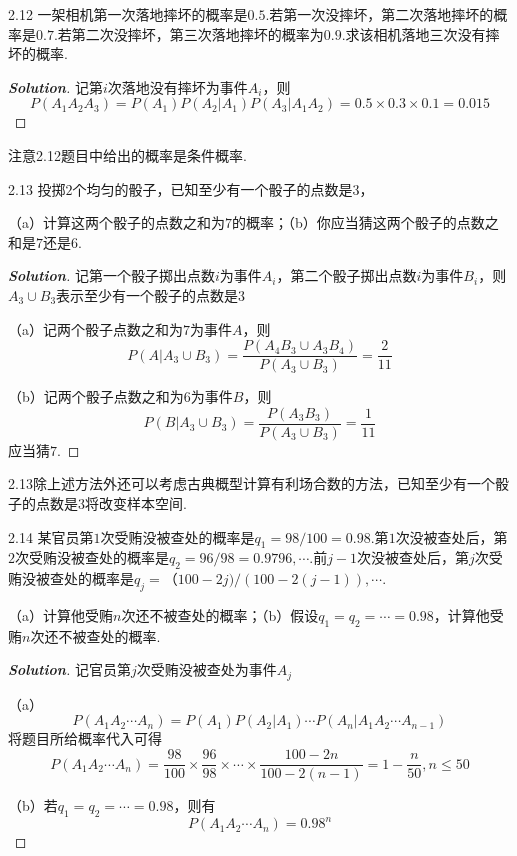 \documentclass[10pt, a4paper, oneside]{ctexart}
\newenvironment{solution}{\begin{proof}[\bf Solution]}{\end{proof}}
\begin{document}
2.12 一架相机第一次落地摔坏的概率是$0.5$.若第一次没摔坏，第二次落地摔坏的概率是$0.7$.若第二次没摔坏，第三次落地摔坏的概率为$0.9$.求该相机落地三次没有摔坏的概率.
\begin{solution}
记第$i$次落地没有摔坏为事件$A_i$，则
\[P({A_1}{A_2}{A_3}) = P({A_1})P({A_2}|{A_1})P({A_3}|{A_1}{A_2}) = 0.5 \times 0.3 \times 0.1 = 0.015\]
\end{solution}
\begin{remark}
注意2.12题目中给出的概率是条件概率.
\end{remark}

2.13 投掷$2$个均匀的骰子，已知至少有一个骰子的点数是$3$，

（a）计算这两个骰子的点数之和为$7$的概率；（b）你应当猜这两个骰子的点数之和是$7$还是$6$.
\begin{solution}
记第一个骰子掷出点数$i$为事件$A_i$，第二个骰子掷出点数$i$为事件$B_i$，则$A_3\cup B_3$表示至少有一个骰子的点数是$3$

（a）记两个骰子点数之和为$7$为事件$A$，则
\[P(A|{A_3} \cup {B_3}) = \frac{{P({A_4}{B_3} \cup {A_3}{B_4})}}{{P({A_3} \cup {B_3})}} = \frac{2}{{11}}\]

（b）记两个骰子点数之和为$6$为事件$B$，则
\[P(B|{A_3} \cup {B_3}) = \frac{{P({A_3}{B_3})}}{{P({A_3} \cup {B_3})}} = \frac{1}{{11}}\]
应当猜$7$.
\end{solution}
\begin{remark}
2.13除上述方法外还可以考虑古典概型计算有利场合数的方法，已知至少有一个骰子的点数是$3$将改变样本空间.
\end{remark}

2.14 某官员第$1$次受贿没被查处的概率是$q_1=98/100=0.98$.第$1$次没被查处后，第$2$次受贿没被查处的概率是$q_2=96/98=0.9796,\cdots$.前$j-1$次没被查处后，第$j$次受贿没被查处的概率是$q_j=（100-2j)/(100-2(j-1)),\cdots$.

（a）计算他受贿$n$次还不被查处的概率；（b）假设$q_1=q_2=\cdots=0.98$，计算他受贿$n$次还不被查处的概率.
\begin{solution}
记官员第$j$次受贿没被查处为事件$A_j$

（a）
\[P({A_1}{A_2} \cdots {A_n}) = P({A_1})P({A_2}|{A_1}) \cdots P({A_n}|{A_1}{A_2} \cdots {A_{n - 1}})\]
将题目所给概率代入可得
\[P({A_1}{A_2} \cdots {A_n}) = \frac{{98}}{{100}} \times \frac{{96}}{{98}} \times  \cdots  \times \frac{{100 - 2n}}{{100 - 2(n - 1)}} = 1 - \frac{n}{{50}},n\leqslant 50\]

（b）若$q_1=q_2=\cdots=0.98$，则有
\[P({A_1}{A_2} \cdots {A_n}) = {0.98^n}\]
\end{solution}
\end{document}
